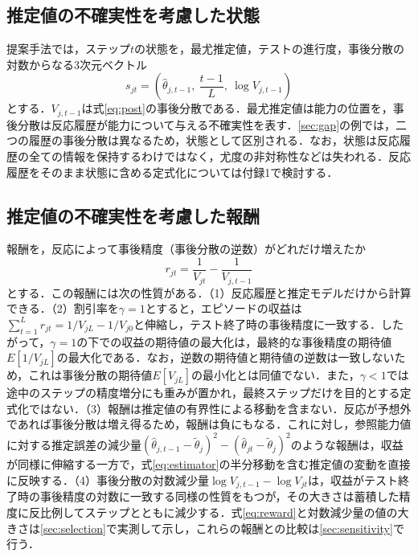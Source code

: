 \documentclass[paper]{ieicej}
\begin{document}
\subsection{推定値の不確実性を考慮した状態}\label{sec:belief}

提案手法では，ステップ$t$の状態を，最尤推定値，テストの進行度，事後分散の対数からなる3次元ベクトル
\begin{equation}
 s_{jt}=\left(\hat\theta_{j,t-1},\ \frac{t-1}{L},\ \log V_{j,t-1}\right)
 \label{eq:state}
\end{equation}
とする．$V_{j,t-1}$は式\eqref{eq:post}の事後分散である．最尤推定値は能力の位置を，事後分散は反応履歴が能力について与える不確実性を表す．\ref{sec:gap}の例では，二つの履歴の事後分散は異なるため，状態として区別される．なお，状態は反応履歴の全ての情報を保持するわけではなく，尤度の非対称性などは失われる．反応履歴をそのまま状態に含める定式化については付録1で検討する．

\subsection{推定値の不確実性を考慮した報酬}\label{sec:reward}

報酬を，反応によって事後精度（事後分散の逆数）がどれだけ増えたか
\begin{equation}
 r_{jt}=\frac{1}{V_{jt}}-\frac{1}{V_{j,t-1}}
 \label{eq:reward}
\end{equation}
とする．この報酬には次の性質がある．（1）反応履歴と推定モデルだけから計算できる．（2）割引率を$\gamma=1$とすると，エピソードの収益は$\sum_{t=1}^{L}r_{jt}=1/V_{jL}-1/V_{j0}$と伸縮し，テスト終了時の事後精度に一致する．したがって，$\gamma=1$の下での収益の期待値の最大化は，最終的な事後精度の期待値$E[1/V_{jL}]$の最大化である．なお，逆数の期待値と期待値の逆数は一致しないため，これは事後分散の期待値$E[V_{jL}]$の最小化とは同値でない．また，$\gamma<1$では途中のステップの精度増分にも重みが置かれ，最終ステップだけを目的とする定式化ではない．（3）報酬は推定値の有界性による移動を含まない．反応が予想外であれば事後分散は増え得るため，報酬は負にもなる．これに対し，参照能力値に対する推定誤差の減少量$(\hat\theta_{j,t-1}-\tilde\theta_j)^2-(\hat\theta_{jt}-\tilde\theta_j)^2$のような報酬は，収益が同様に伸縮する一方で，式\eqref{eq:estimator}の半分移動を含む推定値の変動を直接に反映する．（4）事後分散の対数減少量$\log V_{j,t-1}-\log V_{jt}$は，収益がテスト終了時の事後精度の対数に一致する同様の性質をもつが，その大きさは蓄積した精度に反比例してステップとともに減少する．式\eqref{eq:reward}と対数減少量の値の大きさは\ref{sec:selection}で実測して示し，これらの報酬との比較は\ref{sec:sensitivity}で行う．
\end{document}
